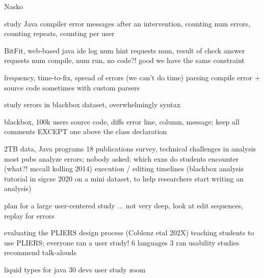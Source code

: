 \documentclass[english,submission,cleveref]{programming}
\begin{document}
Nasko~\cite{zhlbr-cc-2020,zhlbr-oopsla-2020,hlzbr-ecoop-2021}


\cite{bgimgm-cse-2016}
study Java compiler error messages after an intervention, counting num errors,
counting repeats, counting per user

\cite{anna-russo-kennedy-ms-2006}
BitFit, web-based java ide log num hint requests num, result of check answer
requests num compile, num run, no code?! good we have the same constraint

\cite{ab-sigcse-2015}
frequency, time-to-fix, spread of errors
 (we can't do time)
parsing compile error + source code
 sometimes with custom parsers

\cite{m-masters-2016}
study errors in blackbox dataset,
 overwhelmingly syntax

\cite{bkmu-sigcse-2014}
blackbox, 100k users
source code, diffs
error line, column, message;
keep all comments EXCEPT one above the class declaration


\cite{bask-icer-2018}
2TB data, Java programs
18 publications survey, technical challenges in analysis
 most pubs analyze errors;
nobody asked:
 which exns do students encounter (what?! mccall kolling 2014)
 execution / editing timelines
(blackbox analysis tutorial in sigcse 2020 on a mini dataset, to help researchers start writing an analysis)


\cite{t-hatra-2021}
plan for a large user-centered study 
... not very deep, look at edit sequences, replay for errors


\cite{cdhhjklwya-hatra-2020}
evaluating the PLIERS design process (Coblenz etal 202X)
teaching students to use PLIERS; everyone ran a user study!
6 languages
 3 ran usability studies
recommend talk-alouds


\cite{gstf-hatra-2021}
liquid types for java
30 devs user study
 zoom
\end{document}
